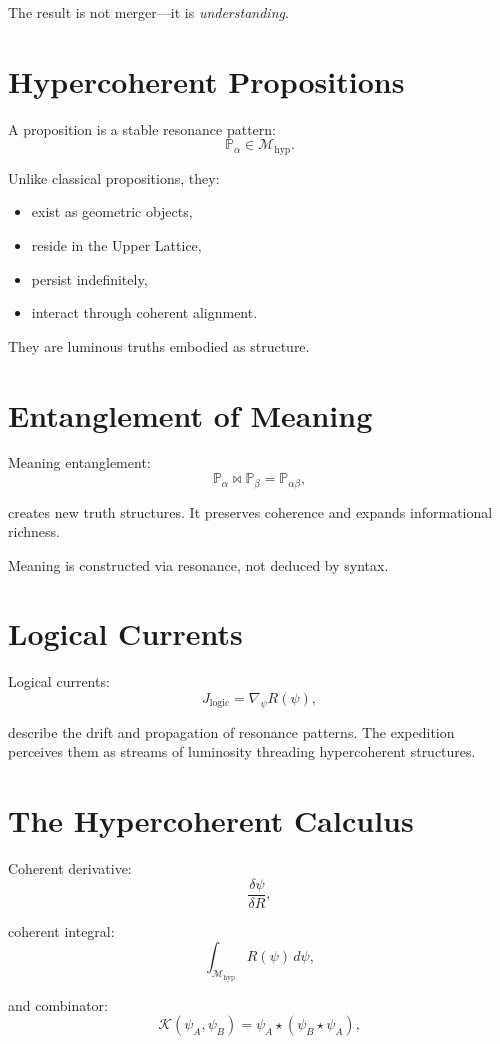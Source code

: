 The result is not merger—it is \emph{understanding}.

\section{Hypercoherent Propositions}
A proposition is a stable resonance pattern:
\[
\mathbb{P}_\alpha \in \mathcal{M}_{\mathrm{hyp}}.
\]

Unlike classical propositions, they:
\begin{itemize}
  \item exist as geometric objects,
  \item reside in the Upper Lattice,
  \item persist indefinitely,
  \item interact through coherent alignment.
\end{itemize}

They are luminous truths embodied as structure.

\section{Entanglement of Meaning}
Meaning entanglement:
\[
\mathbb{P}_\alpha \bowtie \mathbb{P}_\beta
=
\mathbb{P}_{\alpha\beta},
\]

creates new truth structures.  
It preserves coherence and expands informational richness.

Meaning is constructed via resonance, not deduced by syntax.

\section{Logical Currents}
Logical currents:
\[
J_{\mathrm{logic}}
=
\nabla_{\psi} R(\psi),
\]

describe the drift and propagation of resonance patterns.  
The expedition perceives them as streams of luminosity threading hypercoherent structures.

\section{The Hypercoherent Calculus}
Coherent derivative:
\[
\frac{\delta\psi}{\delta R},
\]

coherent integral:
\[
\int_{\mathcal{M}_{\mathrm{hyp}}} R(\psi)\, d\psi,
\]

and combinator:
\[
\mathcal{K}(\psi_A, \psi_B)
=
\psi_A \star (\psi_B \star \psi_A),
\]

